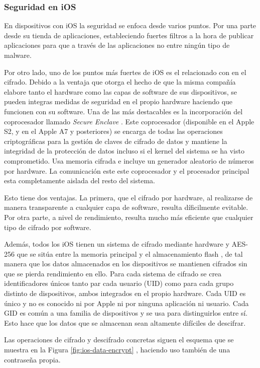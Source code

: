 \subsubsection{Seguridad en iOS}

En dispositivos con iOS la seguridad se enfoca desde varios puntos. Por una parte desde su tienda de aplicaciones, estableciendo fuertes filtros a la hora de publicar aplicaciones para que a través de las aplicaciones no entre ningún tipo de malware.

Por otro lado, uno de los puntos más fuertes de iOS es el relacionado con en el cifrado. Debido a la ventaja que otorga el hecho de que la misma compañía elabore tanto el hardware como las capas de software de sus dispositivos, se pueden integras medidas de seguridad en el propio hardware haciendo que funcionen con su software. Una de las más destacables es la incorporación del coprocesador llamado \emph{Secure Enclave} \cite{ios-sec-guide}. Este coprocesador (disponible en el Apple S2, y en el Apple A7 y posteriores) se encarga de todas las operaciones criptográficas para la gestión de claves de cifrado de datos y mantiene la integridad de la protección de datos incluso si el kernel del sistema se ha visto comprometido. Usa memoria cifrada e incluye un generador aleatorio de números por hardware. La comunicación este este coprocesador y el procesador principal esta completamente aislada del resto del sistema.

Esto tiene dos ventajas. La primera, que el cifrado por hardware, al realizarse de manera transparente a cualquier capa de software, resulta díficilmente evitable. Por otra parte, a nivel de rendimiento, resulta mucho más eficiente que cualquier tipo de cifrado por software.

Además, todos los iOS tienen un sistema de cifrado mediante hardware y AES-256 que se sitúa entre la memoria principal y el almacenamiento flash \cite{ios-sec-guide}, de tal manera que los datos almacenados en los dispositivos se mantienen cifrados sin que se pierda rendimiento en ello. Para cada sistema de cifrado se crea identificadores únicos tanto par cada usuario (UID) como para cada grupo distinto de dispositivos, ambos integrados en el propio hardware. Cada UID es único y no es conocido ni por Apple ni por ninguna aplicación ni usuario. Cada GID es común a una familia de dispositivos y se usa para distinguirlos entre sí. Esto hace que los datos que se almacenan sean altamente difíciles de descifrar.

Las operaciones de cifrado y descifrado concretas siguen el esquema que se muestra en la Figura \ref{fig:ios-data-encrypt} , haciendo uso también de una contraseña propia.

